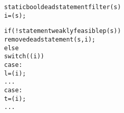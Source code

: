 {\small
\begin{alltt}
static bool dead\Ul{}statement\Ul{}filter( s)
\Ob
   i = (s);

  if (!statement\Ul{}weakly\Ul{}feasible\Ul{}p(s))
    remove\Ul{}dead\Ul{}statement(s, i);
  else \Ob
    switch ((i)) \Ob
    case :
       l = (i);
      ...
    case :
       t = (i);
      ...
\end{alltt}
}
